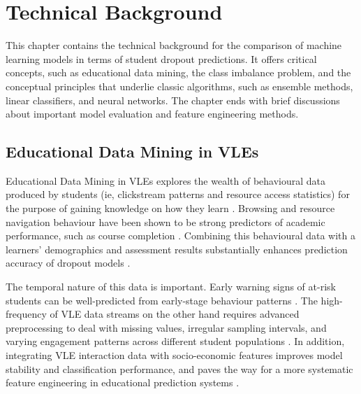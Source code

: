 \documentclass[ %
                    author={Carlos Duran Calle},
                supervisor={Dr. Felipe Campelo},
                    degree={MSc},
                     title={Comparative Machine Learning Analysis for Student Dropout Prediction in a Virtual Learning Environment},
                  subtitle={Incorporating Student Engagement and Socio-Economic Features},
                      type={},
                      year={2025}]{dissertation}
\begin{document}

\chapter{Technical Background}
\label{chap:background}

\vspace{1cm} 

\noindent
This chapter contains the technical background for the comparison of machine learning models in terms of student dropout predictions. It offers critical concepts, such as educational data mining, the class imbalance problem, and the conceptual principles that underlie classic algorithms, such as ensemble methods, linear classifiers, and neural networks. The chapter ends with brief discussions about important model evaluation and feature engineering methods.

\section{Educational Data Mining in VLEs}
Educational Data Mining in VLEs explores the wealth of behavioural data produced by students (ie, clickstream patterns and resource access statistics) for the purpose of gaining knowledge on how they learn \cite{romero_data_2013}. Browsing and resource navigation behaviour have been shown to be strong predictors of academic performance, such as course completion \cite{gasevic_learning_2016}. Combining this behavioural data with a learners' demographics and assessment results substantially enhances prediction accuracy of dropout models \cite{viberg_current_2018}.

The temporal nature of this data is important. Early warning signs of at-risk students can be well-predicted from early-stage behaviour patterns \cite{conijn_predicting_2017}. The high-frequency of VLE data streams on the other hand requires advanced preprocessing to deal with missing values, irregular sampling intervals, and varying engagement patterns across different student populations \cite{sclater_learning_2016}. In addition, integrating VLE interaction data with socio-economic features improves model stability and classification performance, and paves the way for a more systematic feature engineering in educational prediction systems \cite{hlosta_modellingVLE_2018}.
\end{document}
